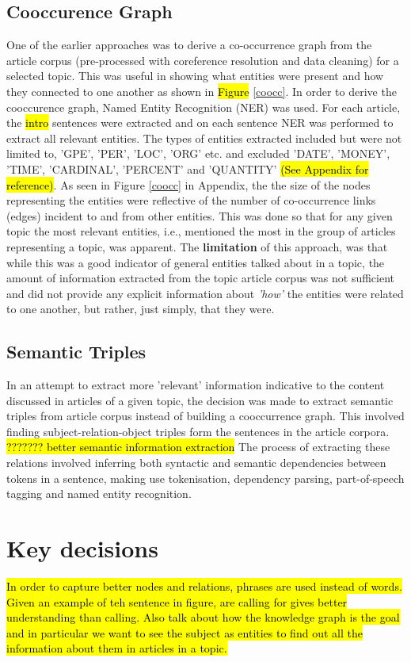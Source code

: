 \subsection{Cooccurence Graph}
One of the earlier approaches was to derive a co-occurrence graph from the article corpus (pre-processed with coreference resolution and data cleaning) for a selected topic. This was useful in showing what entities were present and how they connected to one another as shown in \hl{Figure} \ref{coocc}. In order to derive the cooccurence graph, Named Entity Recognition (NER) was used. For each article, the \hl{intro} sentences were extracted and on each sentence NER was performed to extract all relevant entities. The types of entities extracted included but were not limited to, 'GPE', 'PER', 'LOC', 'ORG' etc. and excluded 'DATE', 'MONEY', 'TIME', 'CARDINAL', 'PERCENT' and 'QUANTITY' \hl{(See Appendix for reference)}. As seen in Figure \ref{coocc} in Appendix, the the size of the nodes representing the entities were reflective of the number of co-occurrence links (edges) incident to and from other entities. This was done so that for any given topic the most relevant entities, i.e., mentioned the most in the group of articles representing a topic, was apparent. The \textbf{limitation} of this approach, was that while this was a good indicator of general entities talked about in a topic, the amount of information extracted from the topic article corpus was not sufficient and did not provide any explicit information about \textit{'how'} the entities were related to one another, but rather, just simply, that they were.

\subsection{Semantic Triples}
In an attempt to extract more 'relevant' information indicative to the content discussed in articles of a given topic, the decision was made to extract semantic triples from article corpus instead of building a cooccurrence graph. 
This involved finding subject-relation-object triples form the sentences in the article corpora. \hl{??????? better semantic information extraction}
The process of extracting these relations involved inferring both syntactic and semantic dependencies between tokens in a sentence, making use tokenisation, dependency parsing,  part-of-speech tagging and named entity recognition.

\section{Key decisions} \label{key_decisions_rel}
\hl{In order to capture better nodes and relations, phrases are used instead of words. Given an example of teh sentence in figure, are calling for gives better understanding than calling. Also talk about how the knowledge graph is the goal and in particular we want to see the subject as entities to find out all the information about them in articles in a topic.}


